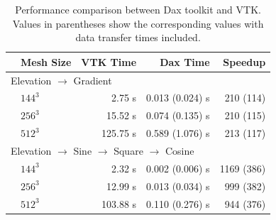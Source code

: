 \documentclass{vgtc}                          %
\begin{document}
\begin{table}[htbp]
  \centering
  \caption{Performance comparison between Dax toolkit and VTK. Values in
    parentheses show the corresponding values with data transfer times
    included.}
  \label{tab:Results}
  \vspace{6pt}
  \begin{tabular}{llrrr}
    \qquad & Mesh Size & VTK Time & Dax Time & Speedup \\
    \hline
    \multicolumn{5}{l}{Elevation $\rightarrow$ Gradient} \\
    & $144^3$ & 2.75 s & 0.013 (0.024) s & 210 (114) \\
    & $256^3$ &  15.52 s & 0.074 (0.135) s & 210 (115) \\
    & $512^3$ &  125.75 s & 0.589 (1.076) s &  213 (117) \\
    \multicolumn{5}{l}{Elevation $\rightarrow$ Sine $\rightarrow$ Square $\rightarrow$ Cosine} \\
    & $144^3$ & 2.32 s & 0.002 (0.006) s &  1169 (386) \\
    & $256^3$ &  12.99 s & 0.013 (0.034) s & 999 (382) \\
    & $512^3$ & 103.88 s & 0.110 (0.276) s &  944 (376) \\
  \end{tabular}
\end{table}

\end{document}

